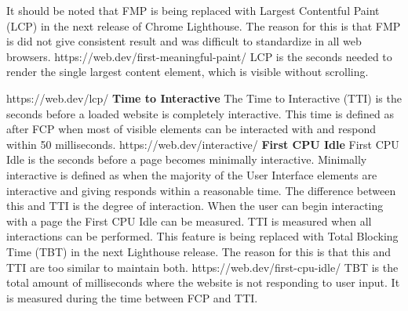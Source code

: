 It should be noted that FMP is being replaced with Largest Contentful Paint (LCP) in the next release of Chrome Lighthouse. The reason for this is that FMP is did not give consistent result and was difficult to standardize in all web browsers.
https://web.dev/first-meaningful-paint/
LCP is the seconds needed to render the single largest content element, which is visible without scrolling.

https://web.dev/lcp/
\textbf{Time to Interactive}
The Time to Interactive (TTI) is the seconds before a loaded website is completely interactive. This time is defined as after FCP when most of visible elements can be interacted with and respond within 50 milliseconds. 
https://web.dev/interactive/
\textbf{First CPU Idle}
First CPU Idle is the seconds before a page becomes minimally interactive. Minimally interactive is defined as when the majority of the User Interface elements are interactive and giving responds within a reasonable time. 
The difference between this and TTI is the degree of interaction. When the user can begin interacting with a page the First CPU Idle can be measured. TTI is measured when all interactions can be performed. 
This feature is being replaced with Total Blocking Time (TBT) in the next Lighthouse release. The reason for this is that this and TTI are too similar to maintain both. 
https://web.dev/first-cpu-idle/
TBT is the total amount of milliseconds where the website is not responding to user input. It is measured during the time between FCP and TTI. 
